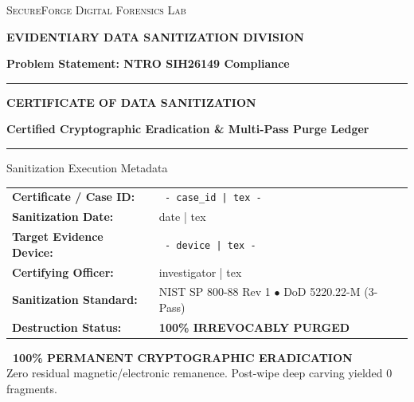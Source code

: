 \documentclass[12pt]{article}
\begin{document}

\begin{titlepage}
    \vspace*{\fill}
    \begin{center}
        {\scshape\Large SecureForge Digital Forensics Lab \par}
        \vspace{0.3cm}
        {\large\textcolor{brandprimary}{\textbf{EVIDENTIARY DATA SANITIZATION DIVISION}} \par}
        \vspace{0.2cm}
        {\normalsize\textbf{Problem Statement: NTRO SIH26149 Compliance} \par}
        \vspace{1.0cm}
        {\color{brandprimary}\rule{\textwidth}{2pt}} \par
        \vspace{0.5cm}
        {\huge\bfseries CERTIFICATE OF DATA SANITIZATION \par}
        \vspace{0.4cm}
        {\large\textcolor{brandprimarydark}{\textbf{Certified Cryptographic Eradication \& Multi-Pass Purge Ledger}} \par}
        \vspace{0.5cm}
        {\color{brandprimary}\rule{\textwidth}{2pt}} \par
        \vspace{1.0cm}
    \end{center}

    \begin{infocard}{Sanitization Execution Metadata}
    \noindent
    \begin{tabularx}{\textwidth}{lX}
    \textbf{Certificate / Case ID:} & \texttt{ {{- case_id | tex -}} } \tabularnewline
    \textbf{Sanitization Date:} & {{ date | tex }} \tabularnewline
    \textbf{Target Evidence Device:} & \texttt{ {{- device | tex -}} } \tabularnewline
    \textbf{Certifying Officer:} & {{ investigator | tex }} \tabularnewline
    \textbf{Sanitization Standard:} & NIST SP 800-88 Rev 1 $\bullet$ DoD 5220.22-M (3-Pass) \tabularnewline
    \textbf{Destruction Status:} & \textcolor{brandsecondary}{\textbf{100\% IRREVOCABLY PURGED}} \tabularnewline
    \end{tabularx}
    \end{infocard}

    \vspace{0.8cm}
    \begin{center}
        \small
        \textcolor{brandsecondary}{\textbf{\checkmark\ 100\% PERMANENT CRYPTOGRAPHIC ERADICATION}} \\
        \footnotesize Zero residual magnetic/electronic remanence. Post-wipe deep carving yielded 0 fragments.
    \end{center}
    \vspace*{\fill}
\end{titlepage}
\end{document}
